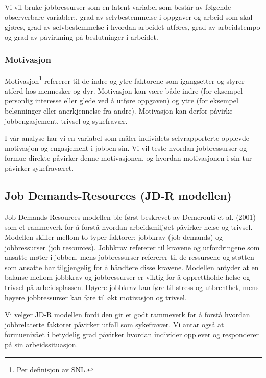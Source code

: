 \documentclass[
  12pt,
  a4paper,
  DIV=11,
  numbers=noendperiod]{scrartcl}
\begin{document}
Vi vil bruke jobbressurser som en latent variabel som består av følgende
observerbare variabler:, grad av selvbestemmelse i oppgaver og arbeid
som skal gjøres, grad av selvbestemmelse i hvordan arbeidet utføres,
grad av arbeidstempo og grad av påvirkning på beslutninger i arbeidet.

\subsubsection{Motivasjon}\label{motivasjon}

Motivasjon\footnote{Per definisjon av
  \href{https://snl.no/motivasjon\#:~:text=Motivasjon\%20er\%20en\%20samlebetegnelse\%20for,motiveres\%20til\%20\%C3\%A5\%20oppn\%C3\%A5\%20dette}{SNL}.}
refererer til de indre og ytre faktorene som igangsetter og styrer
atferd hos mennesker og dyr. Motivasjon kan være både indre (for
eksempel personlig interesse eller glede ved å utføre oppgaven) og ytre
(for eksempel belønninger eller anerkjennelse fra andre). Motivasjon kan
derfor påvirke jobbengasjement, trivsel og sykefravær.

I vår analyse har vi en variabel som måler individets selvrapporterte
opplevde motivasjon og engasjement i jobben sin. Vi vil teste hvordan
jobbressurser og formue direkte påvirker denne motivasjonen, og hvordan
motivasjonen i sin tur påvirker sykefraværet.

\subsection{Job Demands-Resources (JD-R
modellen)}\label{job-demands-resources-jd-r-modellen}

Job Demands-Resources-modellen ble først beskrevet av Demerouti et al.
(2001) som et rammeverk for å forstå hvordan arbeidsmiljøet påvirker
helse og trivsel. Modellen skiller mellom to typer faktorer: jobbkrav
(job demands) og jobbressurser (job resources). Jobbkrav refererer til
kravene og utfordringene som ansatte møter i jobben, mens jobbressurser
refererer til de ressursene og støtten som ansatte har tilgjengelig for
å håndtere disse kravene. Modellen antyder at en balanse mellom jobbkrav
og jobbressurser er viktig for å opprettholde helse og trivsel på
arbeidsplassen. Høyere jobbkrav kan føre til stress og utbrenthet, mens
høyere jobbressurser kan føre til økt motivasjon og trivsel.

Vi velger JD-R modellen fordi den gir et godt rammeverk for å forstå
hvordan jobbrelaterte faktorer påvirker utfall som sykefravær. Vi antar
også at formuenivået i betydelig grad påvirker hvordan individer
opplever og responderer på sin arbeidssituasjon.
\end{document}
